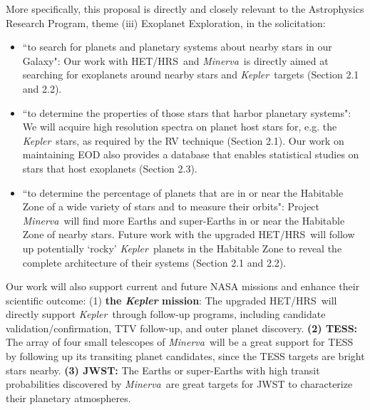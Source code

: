 \documentclass[12pt]{article}
\def\kepler{{\it Kepler}}
\def\minerva{{\it Minerva}}
\def\hrs{HET/HRS}
\begin{document}
More specifically, this proposal is directly and closely relevant to
the Astrophysics Research Program, theme (iii) Exoplanet Exploration,
in the solicitation:
\begin{itemize}[leftmargin=1.5em]
  \vspace{-3pt}
	\item ``to search for planets and planetary systems about
          nearby stars in our Galaxy": Our work with \hrs\ and
          \minerva\ is directly aimed at searching for exoplanets
          around nearby stars and \kepler\ targets (Section 2.1
          and 2.2).
          \vspace{-3pt}
	\item ``to determine the properties of those stars that harbor
          planetary systems": We will acquire high resolution spectra
          on planet host stars for, e.g. the \kepler\ stars, as
          required by the RV technique (Section 2.1). Our work on
          maintaining EOD also provides a database that enables
          statistical studies on stars that host exoplanets (Section
          2.3).
          \vspace{-3pt}
	\item ``to determine the percentage of planets that are in or
          near the Habitable Zone of a wide variety of stars and to
          measure their orbits": Project \minerva\ will find more
          Earths and super-Earths in or near the Habitable Zone of
          nearby stars. Future work with the upgraded \hrs\ will
          follow up potentially `rocky' \kepler\ planets in the
          Habitable Zone to reveal the complete architecture of their
          systems (Section 2.1 and 2.2).
          \vspace{-3pt}
\end{itemize}

Our work will also support current and future NASA missions and
enhance their scientific outcome: (1) {\bf the \textit{Kepler}
  mission}: The upgraded \hrs\ will directly support \kepler\ through
follow-up programs, including candidate validation/confirmation, TTV
follow-up, and outer planet discovery. {\bf (2) TESS:} The array of
four small telescopes of \minerva\ will be a great support for TESS by
following up its transiting planet candidates, since the TESS targets
are bright stars nearby. {\bf (3) JWST:} The Earths or super-Earths
with high transit probabilities discovered by \minerva\ are great
targets for JWST to characterize their planetary atmospheres.


\vspace{-3pt}
\end{document}
